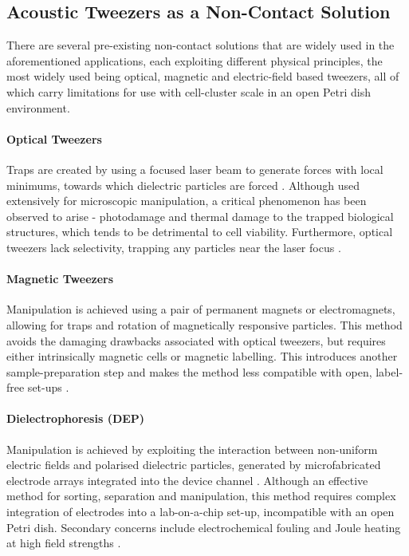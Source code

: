 \documentclass[11pt,a4paper]{article}
\begin{document}
\subsection{Acoustic Tweezers as a Non-Contact Solution}

There are several pre-existing non-contact solutions that are widely used in the aforementioned applications, each exploiting different physical principles, the most widely used being optical, magnetic and electric-field based tweezers, all of which carry limitations for use with cell-cluster scale in an open Petri dish environment. 

\paragraph{Optical Tweezers} Traps are created by using a focused laser beam to generate forces \cite{ashkin1992forces} with local minimums, towards which dielectric particles are forced \cite{kishimoto2022optical, neuman2008single}. Although used extensively for microscopic manipulation, a critical phenomenon has been observed to arise - photodamage and thermal damage to the trapped biological structures, which tends to be detrimental to cell viability. Furthermore, optical tweezers lack selectivity, trapping any particles near the laser focus \cite{blazquez2019optical}. 

\paragraph{Magnetic Tweezers} Manipulation is achieved using a pair of permanent magnets or electromagnets, allowing for traps and rotation of magnetically responsive particles. This method avoids the damaging drawbacks associated with optical tweezers, but requires either intrinsically magnetic cells or magnetic labelling. This introduces another sample-preparation step and makes the method less compatible with open, label-free set-ups \cite{yang2025acoustic, neuman2008single}. 

\paragraph{Dielectrophoresis (DEP)} Manipulation is achieved by exploiting the interaction between non-uniform electric fields and polarised dielectric particles, generated by microfabricated electrode arrays integrated into the device channel \cite{kim2019dielectrophoresis}. Although an effective method for sorting, separation and manipulation, this method requires complex integration of electrodes into a lab-on-a-chip set-up, incompatible with an open Petri dish. Secondary concerns include electrochemical fouling and Joule heating at high field strengths \cite{kim2019dielectrophoresis,yang2025acoustic}. \\
\end{document}
